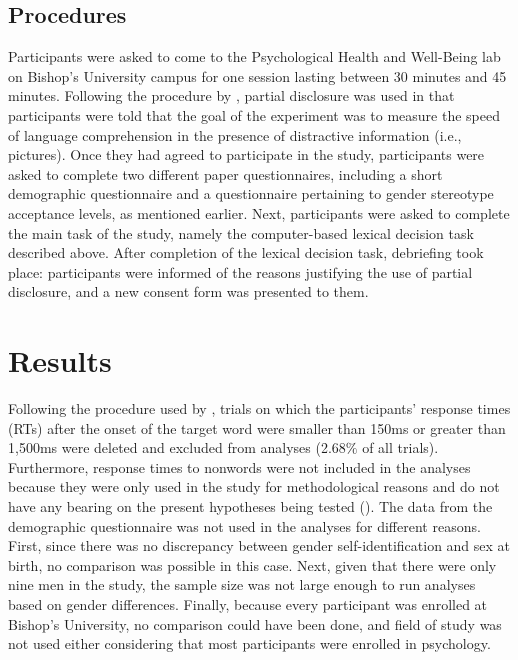\documentclass[serif, authorddate, twocolumn, empirical]{jote-article}
\begin{document}
{}
\subsection*{Procedures}
Participants were asked to come to the Psychological Health and Well-Being lab on Bishop’s University campus for one session lasting between 30 minutes and 45 minutes. Following the procedure by \textcite{BartholowHeinz2006}, partial disclosure was used in that participants were told that the goal of the experiment was to measure the speed of language comprehension in the presence of distractive information (i.e., pictures). Once they had agreed to participate in the study, participants were asked to complete two different paper questionnaires, including a short demographic questionnaire and a questionnaire pertaining to gender stereotype acceptance levels, as mentioned earlier. Next, participants were asked to complete the main task of the study, namely the computer-based lexical decision task described above. After completion of the lexical decision task, debriefing took place: participants were informed of the reasons justifying the use of partial disclosure, and a new consent form was presented to them. 


{}
\section*{Results} %
\label{sec:results}

Following the procedure used by \textcite{BartholowHeinz2006}, trials on which the participants’ response times (RTs) after the onset of the target word were smaller than 150ms or greater than 1,500ms were deleted and excluded from analyses (2.68$\%$  of all trials). Furthermore, response times to nonwords were not included in the analyses because they were only used in the study for methodological reasons and do not have any bearing on the present hypotheses being tested (\cite{BartholowHeinz2006}). The data from the demographic questionnaire was not used in the analyses for different reasons. First, since there was no discrepancy between gender self-identification and sex at birth, no comparison was possible in this case. Next, given that there were only nine men in the study, the sample size was not large enough to run analyses based on gender differences. Finally, because every participant was enrolled at Bishop’s University, no comparison could have been done, and field of study was not used either considering that most participants were enrolled in psychology. 
\end{document}
